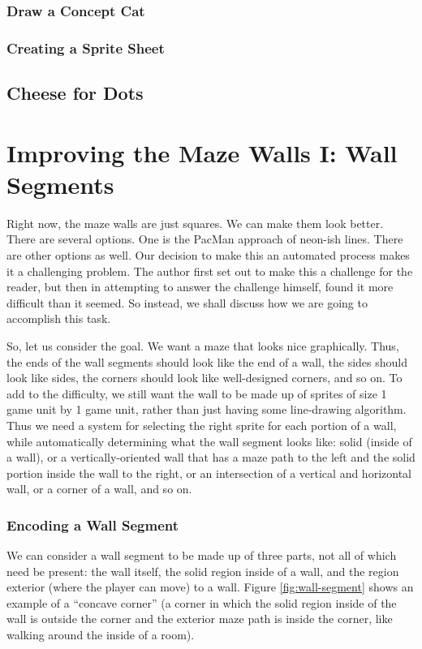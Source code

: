 \documentclass[12pt]{amsbook}
\theoremstyle{definition}
\theoremstyle{remark}
\numberwithin{figure}{chapter}
\numberwithin{table}{chapter}
\numberwithin{section}{chapter}
\numberwithin{equation}{section}
\begin{document}
\subsection{Draw a Concept Cat}

\subsection{Creating a Sprite Sheet}

\section{Cheese for Dots}


\chapter[Improving Maze Walls I]{Improving the Maze Walls I: Wall Segments} 
Right now, the maze walls are just squares.  We can make them look better.  There are several options.  One is the PacMan approach of neon-ish lines.  There are other options as well.  Our decision to make this an automated process makes it a challenging problem.  The author first set out to make this a challenge for the reader, but then in attempting to answer the challenge himself, found it more difficult than it seemed.  So instead, we shall discuss how we are going to accomplish this task.  

So, let us consider the goal.  We want a maze that looks nice graphically.  Thus, the ends of the wall segments should look like the end of a wall, the sides should look like sides, the corners should look like well-designed corners, and so on.  To add to the difficulty, we still want the wall to be made up of sprites of size 1 game unit by 1 game unit, rather than just having some line-drawing algorithm.  Thus we need a system for selecting the right sprite for each portion of a wall, while automatically determining what the wall segment looks like: solid (inside of a wall), or a vertically-oriented wall that has a maze path to the left and the solid portion inside the wall to the right, or an intersection of a vertical and horizontal wall, or a corner of a wall, and so on.

\subsection{Encoding a Wall Segment}

We can consider a wall segment to be made up of three parts, not all of which need be present: the wall itself, the solid region inside of a wall, and the region exterior (where the player can move) to a wall.  Figure \ref{fig:wall-segment} shows an example of a ``concave corner'' (a corner in which the solid region inside of the wall is outside the corner and the exterior maze path is inside the corner, like walking around the inside of a room).
\end{document}
